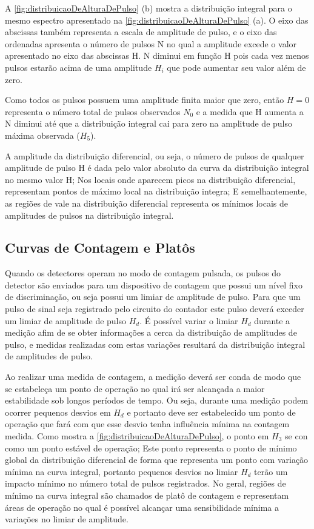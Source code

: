 \documentclass[11pt,a4paper]{article}
\begin{document}
			A  \ref{fig:distribuicaoDeAlturaDePulso} (b) mostra a distribuição integral para o mesmo espectro apresentado na  \ref{fig:distribuicaoDeAlturaDePulso} (a). O eixo das abscissas também representa a escala de amplitude de pulso, e o eixo das ordenadas apresenta o número de pulsos N no qual a amplitude excede o valor apresentado no eixo das abscissas H. N diminui em função H pois cada vez menos pulsos estarão acima de uma amplitude $H_i$ que pode aumentar seu valor além de zero. 
			
			Como todos os pulsos possuem uma amplitude finita maior que zero, então $H = 0$ representa o número total de pulsos observados $N_0$ e a medida que H aumenta a N diminui até que a distribuição integral cai para zero na amplitude de pulso máxima observada ($H_5$). 


		A amplitude da distribuição diferencial, ou seja, o número de pulsos de qualquer amplitude de pulso H é dada pelo valor absoluto da curva da distribuição integral no mesmo valor H; Nos locais onde aparecem picos na distribuição diferencial, representam pontos de máximo local na distribuição integra; E semelhantemente, as regiões de vale na distribuição diferencial representa os mínimos locais de amplitudes de pulsos na distribuição integral. 


	\subsection{Curvas de Contagem e Platôs}

		Quando os detectores operam no modo de contagem pulsada, os pulsos do detector são enviados para um dispositivo de contagem que possui um nível fixo de discriminação, ou seja possui um limiar de amplitude de pulso. Para que um pulso de sinal seja registrado pelo circuito do contador este pulso deverá exceder um limiar de amplitude de pulso $H_d$. É possível variar o limiar $H_d$ durante a medição afim de se obter informações a cerca da distribuição de amplitudes de pulso, e medidas realizadas com estas variações resultará da distribuição integral de amplitudes de pulso. 

		Ao realizar uma medida de contagem, a medição deverá ser conda de modo que se estabeleça um ponto de operação no qual irá ser alcançada a maior estabilidade sob longos períodos de tempo. Ou seja, durante uma medição podem ocorrer pequenos desvios em $H_d$ e portanto deve ser estabelecido um ponto de operação que fará com que esse desvio tenha influência mínima na contagem medida. Como mostra a  \ref{fig:distribuicaoDeAlturaDePulso}, o ponto em $H_3$ se con como um ponto estável de operação; Este ponto representa o ponto de mínimo global da distribuição diferencial de forma que representa um ponto com  variação mínima na curva integral, portanto pequenos desvios no limiar $H_d$ terão um impacto mínimo no número total de pulsos registrados. No geral, regiões de mínimo na curva integral são chamados de platô de contagem e representam áreas de operação no qual é possível alcançar uma sensibilidade mínima a variações no limiar de amplitude. 
\end{document}
